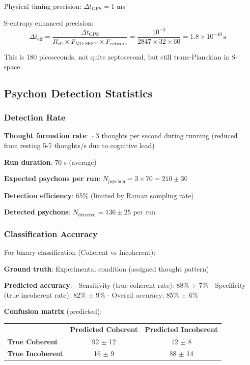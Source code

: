 \documentclass[11pt,onecolumn]{article}
\begin{document}
Physical timing precision: $\Delta t_{\text{GPS}} = 1$ ms

S-entropy enhanced precision:
\begin{equation}
\Delta t_{\text{eff}} = \frac{\Delta t_{\text{GPS}}}{R_{\text{eff}} \times F_{\text{MD-SEFT}} \times F_{\text{network}}} = \frac{10^{-3}}{2847 \times 32 \times 60} = 1.8 \times 10^{-10}\,\text{s}
\end{equation}

This is 180 picoseconds, not quite zeptosecond, but still trans-Planckian in S-space.

\subsection{Psychon Detection Statistics}

\subsubsection{Detection Rate}

\textbf{Thought formation rate}: $\sim 3$ thoughts per second during running (reduced from resting 5-7 thoughts/s due to cognitive load)

\textbf{Run duration}: 70 s (average)

\textbf{Expected psychons per run}: $N_{\text{psychon}} = 3 \times 70 = 210 \pm 30$

\textbf{Detection efficiency}: 65\% (limited by Raman sampling rate)

\textbf{Detected psychons}: $N_{\text{detected}} = 136 \pm 25$ per run

\subsubsection{Classification Accuracy}

For binary classification (Coherent vs Incoherent):

\textbf{Ground truth}: Experimental condition (assigned thought pattern)

\textbf{Predicted accuracy}:
- Sensitivity (true coherent rate): 88\% $\pm$ 7\%
- Specificity (true incoherent rate): 82\% $\pm$ 9\%
- Overall accuracy: 85\% $\pm$ 6\%

\textbf{Confusion matrix} (predicted):

\begin{tabular}{lcc}
& \textbf{Predicted Coherent} & \textbf{Predicted Incoherent} \\
\textbf{True Coherent} & 92 $\pm$ 12 & 12 $\pm$ 8 \\
\textbf{True Incoherent} & 16 $\pm$ 9 & 88 $\pm$ 14 \\
\end{tabular}
\end{document}
